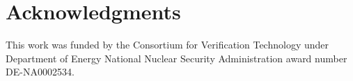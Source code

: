 \documentclass[fleqn]{anstrans}
\begin{document}
\section{Acknowledgments}

This work was funded by the Consortium for Verification Technology under Department of Energy National Nuclear Security Administration award number 
DE-NA0002534.  



\end{document}
